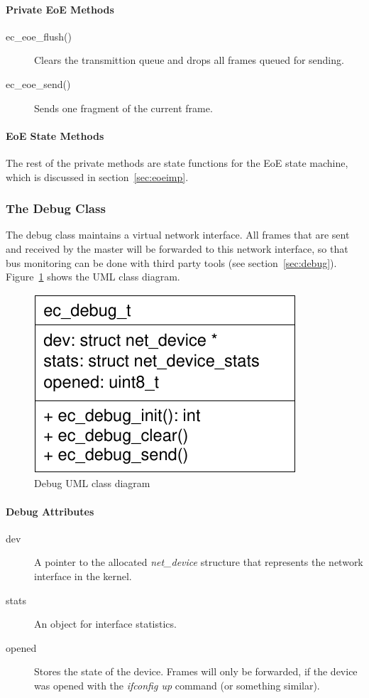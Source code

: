 \documentclass[a4paper,12pt,BCOR6mm,bibtotoc,idxtotoc]{scrbook}
\begin{document}
\paragraph{Private EoE Methods}

\begin{description}
\item[ec\_eoe\_flush()] Clears the transmittion queue and drops all
  frames queued for sending.
\item[ec\_eoe\_send()] Sends one fragment of the current frame.
\end{description}


\paragraph{EoE State Methods}

The rest of the private methods are state functions for the EoE state
machine, which is discussed in section~\ref{sec:eoeimp}.


\subsubsection{The Debug Class}
\label{sec:class-debug}

The debug class maintains a virtual network interface. All frames that
are sent and received by the master will be forwarded to this network
interface, so that bus monitoring can be done with third party tools
(see section~\ref{sec:debug}). Figure~\ref{fig:uml-debug} shows the
UML class diagram.

\begin{figure}[htbp]
  \centering
  \includegraphics[width=.3\textwidth]{images/uml-debug}
  \caption{Debug UML class diagram}
  \label{fig:uml-debug}
\end{figure}

\paragraph{Debug Attributes}

\begin{description}
\item[dev] A pointer to the allocated \textit{net\_device} structure
  that represents the network interface in the kernel.
\item[stats] An object for interface statistics.
\item[opened] Stores the state of the device. Frames will only be
  forwarded, if the device was opened with the \textit{ifconfig up}
  command (or something similar).
\end{description}
\end{document}
